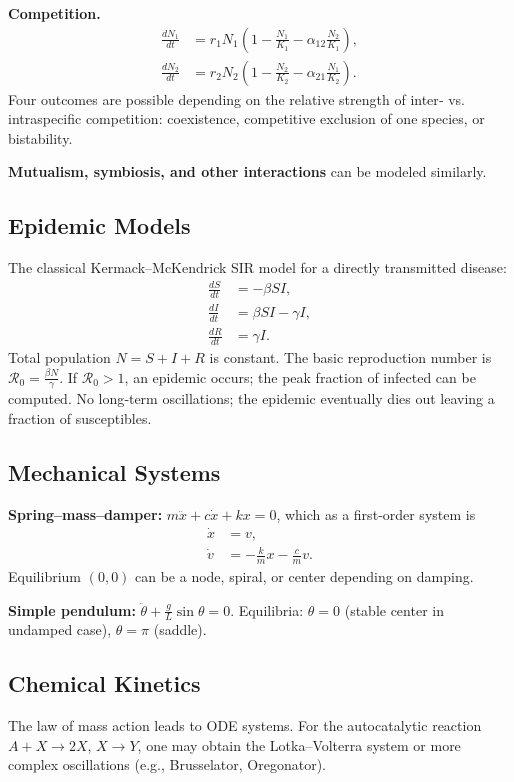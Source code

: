 \documentclass[12pt,a4paper]{book}
\begin{document}
\textbf{Competition.}
\begin{align*}
\frac{dN_1}{dt} &= r_1 N_1 \left(1 - \frac{N_1}{K_1} - \alpha_{12} \frac{N_2}{K_1}\right),\\
\frac{dN_2}{dt} &= r_2 N_2 \left(1 - \frac{N_2}{K_2} - \alpha_{21} \frac{N_1}{K_2}\right).
\end{align*}
Four outcomes are possible depending on the relative strength of inter‑ vs. intraspecific competition: coexistence, competitive exclusion of one species, or bistability.

\textbf{Mutualism, symbiosis, and other interactions} can be modeled similarly.

\subsection{Epidemic Models}
The classical Kermack–McKendrick SIR model for a directly transmitted disease:
\begin{align*}
\frac{dS}{dt} &= -\beta S I,\\
\frac{dI}{dt} &= \beta S I - \gamma I,\\
\frac{dR}{dt} &= \gamma I.
\end{align*}
Total population $N = S + I + R$ is constant. The basic reproduction number is $\mathcal{R}_0 = \frac{\beta N}{\gamma}$. If $\mathcal{R}_0 > 1$, an epidemic occurs; the peak fraction of infected can be computed. No long‑term oscillations; the epidemic eventually dies out leaving a fraction of susceptibles.

\subsection{Mechanical Systems}
\textbf{Spring–mass–damper:}
$m \ddot{x} + c \dot{x} + k x = 0$, which as a first‑order system is
\begin{align*}
\dot{x} &= v,\\
\dot{v} &= -\frac{k}{m} x - \frac{c}{m} v.
\end{align*}
Equilibrium $(0,0)$ can be a node, spiral, or center depending on damping.

\textbf{Simple pendulum:} $\ddot{\theta} + \frac{g}{L} \sin\theta = 0$. Equilibria: $\theta = 0$ (stable center in undamped case), $\theta = \pi$ (saddle).

\subsection{Chemical Kinetics}
The law of mass action leads to ODE systems. For the autocatalytic reaction $A + X \to 2X$, $X \to Y$, one may obtain the Lotka–Volterra system or more complex oscillations (e.g., Brusselator, Oregonator).
\end{document}
